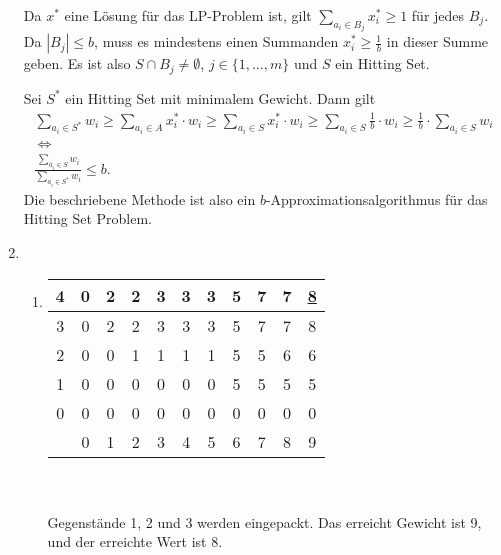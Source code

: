 \documentclass[a4paper]{scrartcl}
\newcommand{\gdw}{\ \Leftrightarrow\ }
\begin{document}
\begin{enumerate}[label=\bfseries \arabic*.]
    Da $x^\ast$ eine Lösung für das LP-Problem ist, gilt $\sum_{a_i \in B_j}
    x^\ast_i \geq 1$ für jedes $B_j$.  Da $|B_j| \leq b$, muss es mindestens
    einen Summanden $x^\ast_i \geq \frac{1}{b}$ in dieser Summe geben.
    Es ist also $S \cap B_j \neq \emptyset$, $j \in \{1, \dotsc, m\}$ und $S$
    ein Hitting Set.

    Sei $S^\ast$ ein Hitting Set mit minimalem Gewicht. Dann gilt
    \begin{equation*}
        \begin{gathered}
            \sum_{a_i \in S^\ast} w_i
            \geq \sum_{a_i \in A} x^\ast_i \cdot w_i
            \geq \sum_{a_i \in S} x^\ast_i \cdot w_i
            \geq \sum_{a_i \in S} \frac{1}{b} \cdot w_i
            \geq \frac{1}{b} \cdot \sum_{a_i \in S} w_i \\
            \gdw \\
            \frac{\sum_{a_i \in S} w_i}{\sum_{a_i \in S^\ast} w_i}
            \leq b.
        \end{gathered}
    \end{equation*}
    Die beschriebene Methode ist also ein $b$-Approximationsalgorithmus für das
    Hitting Set Problem.

\item %
\begin{enumerate}
    \item %
        \begin{tabular}[t]{c||c|c|c|c|c|c|c|c|c|c|}
            4 & 0 & 2 & 2 & 3 & 3 & 3 & 5 & 7 & 7 & \underline{8} \\ \hline
            3 & 0 & 2 & 2 & 3 & 3 & 3 & 5 & 7 & 7 & 8 \\ \hline
            2 & 0 & 0 & 1 & 1 & 1 & 1 & 5 & 5 & 6 & 6 \\ \hline
            1 & 0 & 0 & 0 & 0 & 0 & 0 & 5 & 5 & 5 & 5 \\ \hline
            0 & 0 & 0 & 0 & 0 & 0 & 0 & 0 & 0 & 0 & 0 \\ \hhline{=#=|=|=|=|=|=|=|=|=|=|}
              & 0 & 1 & 2 & 3 & 4 & 5 & 6 & 7 & 8 & 9\\
        \end{tabular}
        \\ \\
        Gegenstände 1, 2 und 3 werden eingepackt. Das erreicht Gewicht ist 9,
        und der erreichte Wert ist 8.


\end{enumerate}
\end{enumerate}
\end{document}
